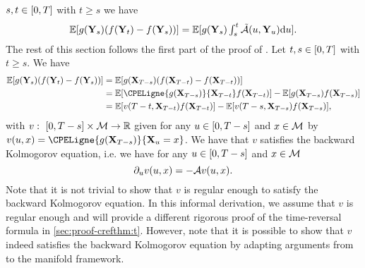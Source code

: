   $s, t \in \left[0,T\right]$ with $t \geq s$ we have 
  \begin{equation}
    \label{eq:time_reversal_manifold_haussman}    
    \textstyle{\mathbb{E}[ g(\mathbf{Y}_s)(f(\mathbf{Y}_t) - f(\mathbf{Y}_s)) ] = \mathbb{E}[ g(\mathbf{Y}_s)\int_s^t \tilde{\mathcal{A}}(u, \mathbf{Y}_u) \mathrm{d}u ]  . }
  \end{equation}
  The rest of this section follows the first part of the proof of \citet[Theorem 2.1]{haussmann1986time}.
  Let $t, s \in \left[0,T\right]$ with $t \geq s$. We have
  \begin{align}
    \textstyle{\expeLigne{g(\bfY_s)(f(\bfY_t) - f(\bfY_s))}} &= \textstyle{\expeLigne{g(\bfX_{T-s})(f(\bfX_{T-t}) - f(\bfX_{T-t}))}} \\
                                                             &= \textstyle{\expeLigne{\CPELigne{g(\bfX_{T-s})}{\bfX_{T-t}}f(\bfX_{T-t})} - \expeLigne{g(\bfX_{T-s})f(\bfX_{T-s})}} \\
                                                             &= \textstyle{\expeLigne{v(T-t,\bfX_{T-t})f(\bfX_{T-t})} - \expeLigne{v(T-s,\bfX_{T-s})f(\bfX_{T-s})}}  ,
                                                               \label{eq:first_der}
  \end{align}
  with $v: \ \ccint{0,T-s} \times \M \to \rset$ given for any $u \in \left[0,T-s\right]$
  and $x \in \mathcal M$ by $v(u,x) = \CPELigne{g(\bfX_{T-s})}{\bfX_u=x}$. We have that $v$
  satisfies the backward Kolmogorov equation, i.e. we have for any
  $u \in \left[0,T-s\right]$ and $x \in \mathcal M$
  \begin{equation}
    \label{eq:backward_kolmogorov}
    \partial_u v(u,x) = -\mathcal{A} v(u,x) . 
  \end{equation}
  Note that it is not trivial to show that $v$ is regular enough to satisfy the
  backward Kolmogorov equation. In this informal derivation, we assume that $v$
  is regular enough and will provide a different rigorous proof of the
  time-reversal formula in \cref{sec:proof-crefthm:t}. However, note that it is
  possible to show that $v$ indeed satisfies the backward Kolmogorov equation by
  adapting arguments from \citet{haussmann1986time} to the manifold framework.

